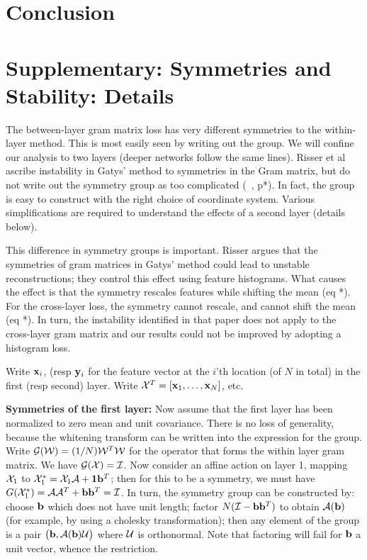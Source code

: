 \documentclass[runningheads]{llncs}
\newcommand{\vect}[1]{{\bf {#1}}}
\newcommand{\matx}[1]{{\cal {#1}}}
\begin{document}
\section{Conclusion}
  

\section*{Supplementary: Symmetries and Stability: Details}


The between-layer gram matrix loss has very different symmetries to the within-layer method.
This is most easily seen by writing out the group.  We will confine our analysis to two layers
(deeper networks follow the same lines).   Risser et al ascribe instability in Gatys' method to
symmetries in the Gram matrix, but do not write out the symmetry group as too complicated
(~\cite{}, p*).  In fact, the group is easy to construct with the right choice of coordinate system.
Various simplifications are required to understand the effects of a
second layer (details below).


This difference in symmetry groups is important.  Risser argues that
the symmetries of gram matrices in Gatys' method could lead to
unstable reconstructions; they control this effect using feature
histograms.  What causes the effect is that the symmetry rescales features while shifting the mean (eq *).  
For the cross-layer loss, the symmetry cannot rescale, and cannot shift the mean (eq *).  In turn, the instability
identified in that paper does not apply to the cross-layer gram matrix and our results could not be improved by adopting
a histogram loss.

Write $\vect{x}_{i}$, (resp $\vect{y}_i$ for the feature vector at the $i$'th location (of $N$ in total)
in the first (resp second) layer.  Write $\matx{X}^T=\left[\vect{x}_{1}, \ldots,
\vect{x}_{N}\right]$, etc.   

{\bf Symmetries of the first layer:} Now assume that the first layer has been normalized to zero mean and
unit covariance.  There is no loss of generality, because the whitening transform
can be written into the expression for the group. Write ${\cal
  G}(\matx{W})=(1/N)\matx{W}^T\matx{W}$ for the operator that forms
the within layer gram matrix. We have ${\cal G}(\matx{X})=\matx{I}$.   
Now consider an affine action on layer 1, mapping $\matx{X}_1$ to $\matx{X}_1^*=\matx{X}_1 \matx{A}+\vect{1}\vect{b}^T$; then for this to be a symmetry, we must have
$G(\matx{X}_1^*)= \matx{A}\matx{A}^T+\vect{b}\vect{b}^T=\matx{I}$.  In
turn, the symmetry group can be constructed by: choose $\vect{b}$
which does not have unit length; factor
$N(\matx{I}-\vect{b}\vect{b}^T)$ to obtain $\matx{A}(\vect{b})$ (for
example, by using a cholesky transformation); then any element of the
group is a pair $\left(\vect{b}, \matx{A}(\vect{b})\matx{U}\right)$
where $\matx{U}$ is orthonormal.  Note that factoring will fail for
$\vect{b}$ a unit vector, whence the restriction. 
\end{document}
